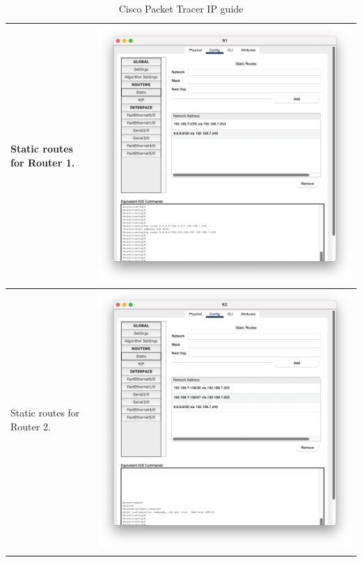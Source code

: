 \documentclass[11pt,a4paper]{report}
\begin{document}
\begin{flushleft}
\begin{center}
\begin{longtable}{ m{5cm} l }
                        Static routes for Router 1.     & \includegraphics[scale=0.35  ,valign=c]{r1-staticroute}                \\ \hline
                        Static routes for Router 2.     & \includegraphics[scale=0.35  ,valign=c]{r2-staticroute}                \\ \hline

                        \caption{Cisco Packet Tracer IP guide}
                        \label{tab:cptg1.5}
                    \end{longtable}
                \end{center}
        \end{flushleft}
\end{document}
